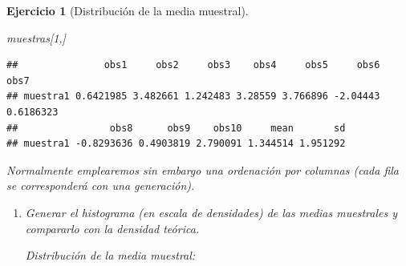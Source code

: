 \documentclass[
]{book}
\newenvironment{Shaded}{\begin{snugshade}}{\end{snugshade}}
\newcommand{\AttributeTok}[1]{\textcolor[rgb]{0.77,0.63,0.00}{#1}}
\newcommand{\CommentTok}[1]{\textcolor[rgb]{0.56,0.35,0.01}{\textit{#1}}}
\newcommand{\ConstantTok}[1]{\textcolor[rgb]{0.00,0.00,0.00}{#1}}
\newcommand{\DecValTok}[1]{\textcolor[rgb]{0.00,0.00,0.81}{#1}}
\newcommand{\FunctionTok}[1]{\textcolor[rgb]{0.00,0.00,0.00}{#1}}
\newcommand{\NormalTok}[1]{#1}
\newcommand{\SpecialCharTok}[1]{\textcolor[rgb]{0.00,0.00,0.00}{#1}}
\newcommand{\StringTok}[1]{\textcolor[rgb]{0.31,0.60,0.02}{#1}}
\theoremstyle{break}
\newtheorem{exercise}{Ejercicio}[chapter]
\theoremstyle{nonumberplain}
\renewcommand{\CommentTok}[1]{\textcolor[rgb]{0.41,0.41,0.41}{\texttt{#1}}}
\begin{document}
\begin{exercise}[Distribución de la media muestral]
\begin{enumerate}
\begin{Shaded}
\begin{Highlighting}[]
\NormalTok{muestras[}\DecValTok{1}\NormalTok{,]}
\end{Highlighting}
\end{Shaded}

\begin{verbatim}
##               obs1     obs2     obs3    obs4     obs5     obs6      obs7
## muestra1 0.6421985 3.482661 1.242483 3.28559 3.766896 -2.04443 0.6186323
##                obs8      obs9    obs10     mean       sd
## muestra1 -0.8293636 0.4903819 2.790091 1.344514 1.951292
\end{verbatim}
\end{enumerate}

Normalmente emplearemos sin embargo una ordenación por columnas (cada fila se corresponderá con una generación).

\begin{enumerate}
\def\labelenumi{\alph{enumi})}
\setcounter{enumi}{1}
\item
  Generar el histograma (en escala de densidades) de las medias
  muestrales y compararlo con la densidad teórica.

  Distribución de la media muestral:

\begin{Shaded}
\end{Shaded}


\end{enumerate}
\end{exercise}
\end{document}
